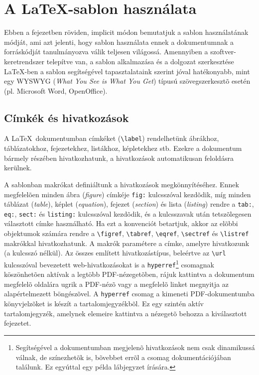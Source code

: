 \chapter{A \LaTeX-sablon használata}
Ebben a fejezetben röviden, implicit módon bemutatjuk a sablon használatának módját, ami azt jelenti, hogy sablon használata ennek a dokumentumnak a forráskódját tanulmányozva válik teljesen világossá. Amennyiben a szoftver-keretrendszer telepítve van, a sablon alkalmazása és a dolgozat szerkesztése \LaTeX-ben a sablon segítségével tapasztalataink szerint jóval hatékonyabb, mint egy WYSWYG (\emph{What You See is What You Get}) típusú szövegszerkesztõ esetén (pl. Microsoft Word, OpenOffice).

\section{Címkék és hivatkozások}
A \LaTeX~dokumentumban címkéket (\verb+\label+) rendelhetünk ábrákhoz, táblázatokhoz, fejezetekhez, listákhoz, képletekhez stb. Ezekre a dokumentum bármely részében hivatkozhatunk, a hivatkozások automatikusan feloldásra kerülnek.

A sablonban makrókat definiáltunk a hivatkozások megkönnyítéséhez. Ennek megfelelõen minden ábra (\emph{figure}) címkéje \verb+fig:+ kulcsszóval kezdõdik, míg minden táblázat (\emph{table}), képlet (\emph{equation}), fejezet (\emph{section}) és lista (\emph{listing}) rendre a \verb+tab:+, \verb+eq:+, \verb+sect:+ és \verb+listing:+ kulcsszóval kezdõdik, és a kulcsszavak után tetszõlegesen választott címke használható. Ha ezt a konvenciót betartjuk, akkor az elõbbi objektumok számára rendre a \verb+\figref+, \verb+\tabref+, \verb+\eqref+, \verb+\sectref+ és \verb+\listref+ makrókkal hivatkozhatunk. A makrók paramétere a címke, amelyre hivatkozunk (a kulcsszó nélkül). Az összes említett hivatkozástípus, beleértve az \verb+\url+ kulcsszóval bevezetett web-hivatkozásokat is a  \verb+hyperref+\footnote{Segítségével a dokumentumban megjelenõ hivatkozások nem csak dinamikussá válnak, de színezhetõk is, bõvebbet errõl a csomag dokumentációjában találunk. Ez egyúttal egy példa lábjegyzet írására.} csomagnak köszönhetõen aktívak a legtöbb PDF-nézegetõben, rájuk kattintva a dokumentum megfelelõ oldalára ugrik a PDF-nézõ vagy a megfelelõ linket megnyitja az alapértelmezett böngészõvel. A \verb+hyperref+ csomag a kimeneti PDF-dokumentumba könyvjelzõket is készít a tartalomjegyzékbõl. Ez egy szintén aktív tartalomjegyzék, amelynek elemeire kattintva a nézegetõ behozza a kiválasztott fejezetet.

